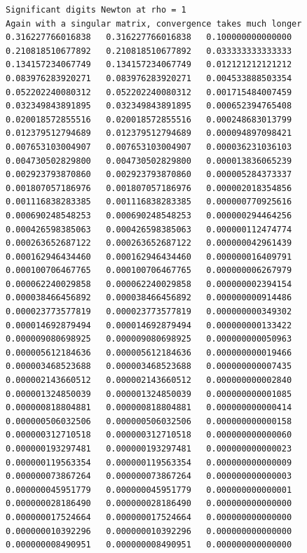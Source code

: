 \documentclass[11pt]{amsart}
\begin{document}
\begin{lstlisting}
Significant digits Newton at rho = 1
Again with a singular matrix, convergence takes much longer
0.316227766016838   0.316227766016838   0.100000000000000
0.210818510677892   0.210818510677892   0.033333333333333
0.134157234067749   0.134157234067749   0.012121212121212
0.083976283920271   0.083976283920271   0.004533888503354
0.052202240080312   0.052202240080312   0.001715484007459
0.032349843891895   0.032349843891895   0.000652394765408
0.020018572855516   0.020018572855516   0.000248683013799
0.012379512794689   0.012379512794689   0.000094897098421
0.007653103004907   0.007653103004907   0.000036231036103
0.004730502829800   0.004730502829800   0.000013836065239
0.002923793870860   0.002923793870860   0.000005284373337
0.001807057186976   0.001807057186976   0.000002018354856
0.001116838283385   0.001116838283385   0.000000770925616
0.000690248548253   0.000690248548253   0.000000294464256
0.000426598385063   0.000426598385063   0.000000112474774
0.000263652687122   0.000263652687122   0.000000042961439
0.000162946434460   0.000162946434460   0.000000016409791
0.000100706467765   0.000100706467765   0.000000006267979
0.000062240029858   0.000062240029858   0.000000002394154
0.000038466456892   0.000038466456892   0.000000000914486
0.000023773577819   0.000023773577819   0.000000000349302
0.000014692879494   0.000014692879494   0.000000000133422
0.000009080698925   0.000009080698925   0.000000000050963
0.000005612184636   0.000005612184636   0.000000000019466
0.000003468523688   0.000003468523688   0.000000000007435
0.000002143660512   0.000002143660512   0.000000000002840
0.000001324850039   0.000001324850039   0.000000000001085
0.000000818804881   0.000000818804881   0.000000000000414
0.000000506032506   0.000000506032506   0.000000000000158
0.000000312710518   0.000000312710518   0.000000000000060
0.000000193297481   0.000000193297481   0.000000000000023
0.000000119563354   0.000000119563354   0.000000000000009
0.000000073867264   0.000000073867264   0.000000000000003
0.000000045951779   0.000000045951779   0.000000000000001
0.000000028186490   0.000000028186490   0.000000000000000
0.000000017524664   0.000000017524664   0.000000000000000
0.000000010392296   0.000000010392296   0.000000000000000
0.000000008490951   0.000000008490951   0.000000000000000

\end{lstlisting}
\end{document}
